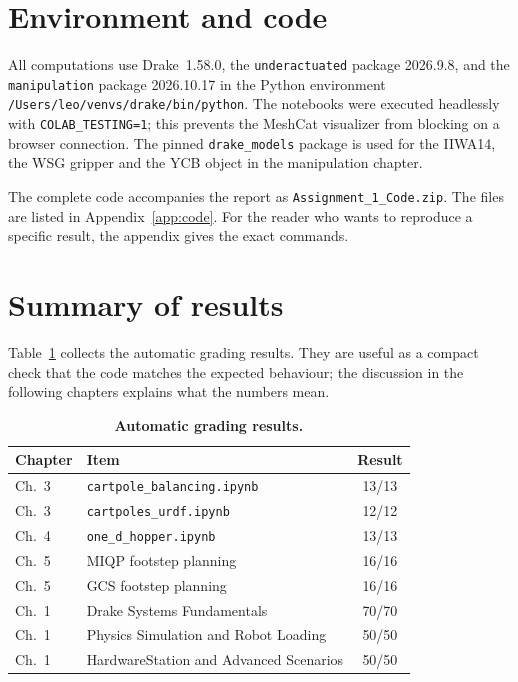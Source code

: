 \documentclass[11pt]{report}
\begin{document}
\section{Environment and code}

All computations use Drake~1.58.0, the \texttt{underactuated} package
2026.9.8, and the \texttt{manipulation} package 2026.10.17 in the Python
environment \texttt{/Users/leo/venvs/drake/bin/python}.  The notebooks were
executed headlessly with \texttt{COLAB\_TESTING=1}; this prevents the MeshCat
visualizer from blocking on a browser connection.  The pinned
\texttt{drake\_models} package is used for the IIWA14, the WSG gripper and the
YCB object in the manipulation chapter.

The complete code accompanies the report as \texttt{Assignment\_1\_Code.zip}.
The files are listed in Appendix~\ref{app:code}.  For the reader who
wants to reproduce a specific result, the appendix gives the exact commands.

\section{Summary of results}

Table~\ref{tab:results} collects the automatic grading results.  They are
useful as a compact check that the code matches the expected behaviour; the
discussion in the following chapters explains what the numbers mean.

\begin{table}[!htbp]
\centering
\caption{\textbf{Automatic grading results.}}
\label{tab:results}
\begin{tabular}{llc}
\toprule
Chapter & Item & Result \\
\midrule
Ch.~3 & \texttt{cartpole\_balancing.ipynb} & 13/13 \\
Ch.~3 & \texttt{cartpoles\_urdf.ipynb} & 12/12 \\
Ch.~4 & \texttt{one\_d\_hopper.ipynb} & 13/13 \\
Ch.~5 & MIQP footstep planning & 16/16 \\
Ch.~5 & GCS footstep planning & 16/16 \\
Ch.~1 & Drake Systems Fundamentals & 70/70 \\
Ch.~1 & Physics Simulation and Robot Loading & 50/50 \\
Ch.~1 & HardwareStation and Advanced Scenarios & 50/50 \\
\bottomrule
\end{tabular}
\end{table}
\end{document}
